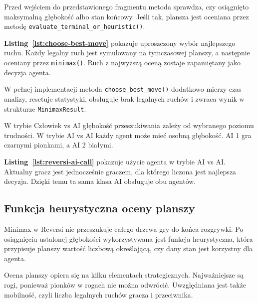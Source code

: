 Przed wejściem do przedstawionego fragmentu metoda sprawdza, czy osiągnięto maksymalną głębokość albo stan końcowy. Jeśli tak, plansza jest oceniana przez metodę \texttt{evaluate\_terminal\_or\_heuristic()}.



\textbf{Listing~\ref{lst:choose-best-move}} pokazuje uproszczony wybór najlepszego ruchu. Każdy legalny ruch jest symulowany na tymczasowej planszy, a następnie oceniany przez \texttt{minimax()}. Ruch z najwyższą oceną zostaje zapamiętany jako decyzja agenta.

W pełnej implementacji metoda \texttt{choose\_best\_move()} dodatkowo mierzy czas analizy, resetuje statystyki, obsługuje brak legalnych ruchów i zwraca wynik w strukturze \texttt{MinimaxResult}.

W trybie Człowiek vs AI głębokość przeszukiwania zależy od wybranego poziomu trudności. W trybie AI vs AI każdy agent może mieć osobną głębokość. AI 1 gra czarnymi pionkami, a AI 2 białymi.



\textbf{Listing~\ref{lst:reversi-ai-call}} pokazuje użycie agenta w trybie AI vs AI. Aktualny gracz jest jednocześnie graczem, dla którego liczona jest najlepsza decyzja. Dzięki temu ta sama klasa AI obsługuje obu agentów.

\subsection{Funkcja heurystyczna oceny planszy}

Minimax w Reversi nie przeszukuje całego drzewa gry do końca rozgrywki. Po osiągnięciu ustalonej głębokości wykorzystywana jest funkcja heurystyczna, która przypisuje planszy wartość liczbową określającą, czy dany stan jest korzystny dla agenta.

Ocena planszy opiera się na kilku elementach strategicznych. Najważniejsze są rogi, ponieważ pionków w rogach nie można odwrócić. Uwzględniana jest także mobilność, czyli liczba legalnych ruchów gracza i przeciwnika.

